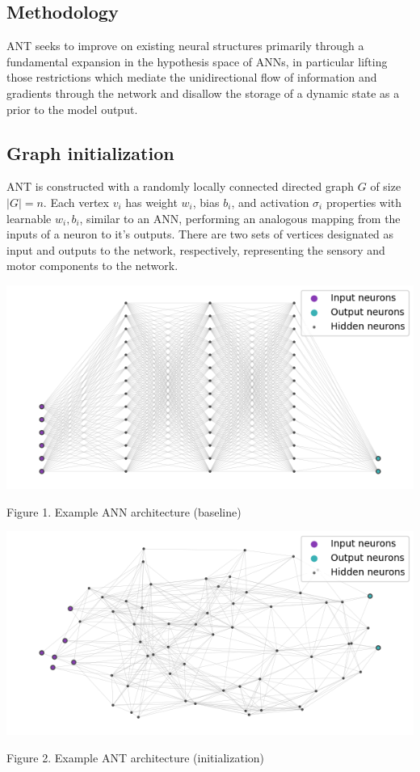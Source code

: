 \documentclass{article}
\begin{document}
\begin{multicols}{2}
	\section{Methodology}
	
	ANT seeks to improve on existing neural structures primarily through a fundamental expansion in the hypothesis space of ANNs, in particular lifting those restrictions which mediate the unidirectional flow of information and gradients through the network and disallow the storage of a dynamic state as a prior to the model output.
	
	\subsection{Graph initialization}
	
	ANT is constructed with a randomly locally connected directed graph $G$ of size $|G| = n$. Each vertex $v_i$ has weight $w_i$, bias $b_i$, and activation $\sigma_i$ properties with learnable $w_i, b_i$, similar to an ANN, performing an analogous mapping from the inputs of a neuron to it's outputs. There are two sets of vertices designated as input and outputs to the network, respectively, representing the sensory and motor components to the network. 
	
	\vspace{10pt}
	
	\includegraphics[scale=0.58]{figs/ann_architecture}
	\begin{center}
		\small Figure 1. Example ANN architecture (baseline)
	\end{center}
	
	\vspace{5pt}
	\includegraphics[scale=0.58]{figs/ant_architecture_2}
	\begin{center}
		\small Figure 2. Example ANT architecture (initialization)
	\end{center}
	

\end{multicols}
\end{document}
